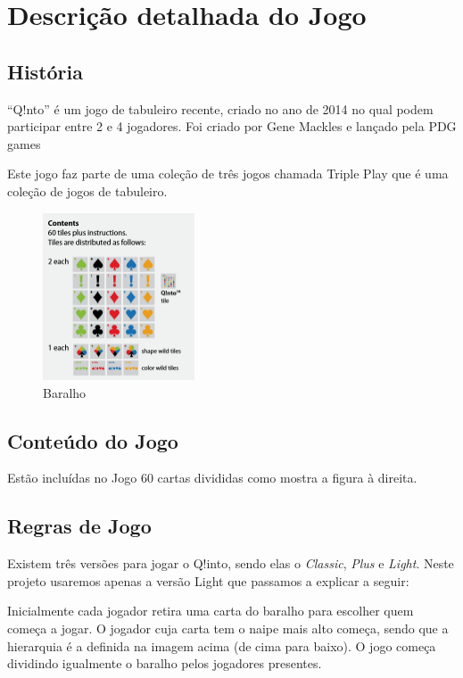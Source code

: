 \documentclass[a4paper]{article}
\begin{document}
	\newpage
	
	\section{Descrição detalhada do Jogo}
	\subsection{História}
	
	“Q!nto” é um jogo de tabuleiro recente, criado no ano de 2014 no qual podem participar entre 2 e 4 jogadores. Foi criado por Gene Mackles e lançado pela PDG games
	
	Este jogo faz parte de uma coleção de três jogos chamada Triple Play que é uma coleção de jogos de tabuleiro.
	
	\begin{figure}
	\includegraphics[width=0.4\textwidth]{./res/cards.png}
	\caption{\label{fig:Baralho}Baralho}
	\end{figure}
	
	\subsection{Conteúdo do Jogo}
	
	Estão incluídas no Jogo 60 cartas divididas como mostra a figura à direita.
	
	\subsection{Regras de Jogo}
	
	Existem três versões para jogar o Q!into, sendo elas o
	\textit{Classic},
	\textit{Plus} e
	\textit{Light}. Neste projeto usaremos apenas a versão Light que passamos a explicar a seguir:
	
	Inicialmente cada jogador retira uma carta do baralho para escolher quem começa a jogar. O jogador cuja carta tem o naipe mais alto começa, sendo que a hierarquia é a definida na imagem acima (de cima para baixo). O jogo começa dividindo igualmente o baralho pelos jogadores presentes.
	
\end{document}
